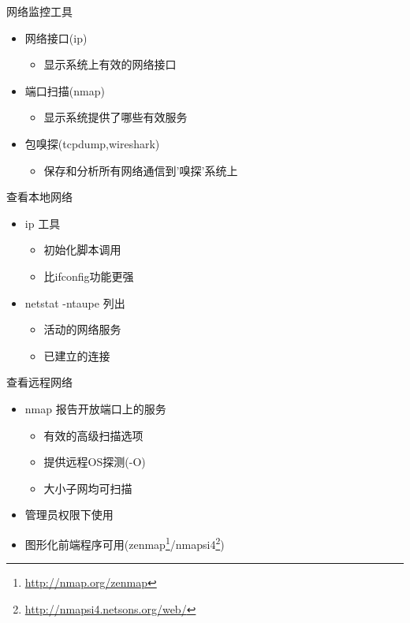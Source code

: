  \begin{frame}{网络监控工具}
\begin{itemize}
	\item 网络接口(ip)
	
	\begin{itemize}
		\item 显示系统上有效的网络接口
	\end{itemize}
	\item 端口扫描(nmap)
	
	\begin{itemize}
		\item 显示系统提供了哪些有效服务
	\end{itemize}
	\item 包嗅探(tcpdump,wireshark)
	
	\begin{itemize}
		\item 保存和分析所有网络通信到'嗅探'系统上
	\end{itemize}
\end{itemize}

\end{frame} 

\begin{frame}{查看本地网络}
\begin{itemize}
\item ip 工具

\begin{itemize}
\item 初始化脚本调用
\item 比ifconfig功能更强
\end{itemize}
\item netstat -ntaupe 列出

\begin{itemize}
\item 活动的网络服务
\item 已建立的连接
\end{itemize}
\end{itemize}

\end{frame} 

\begin{frame}{查看远程网络}
\begin{itemize}
\item nmap 报告开放端口上的服务

\begin{itemize}
\item 有效的高级扫描选项
\item 提供远程OS探测(-O)
\item 大小子网均可扫描
\end{itemize}
\item 管理员权限下使用
\item 图形化前端程序可用(zenmap\footnote{\href{http://nmap.org/zenmap/}{http://nmap.org/zenmap}}/nmapsi4\footnote{\href{http://nmapsi4.netsons.org/web/}{http://nmapsi4.netsons.org/web/}})
\end{itemize}

\end{frame} 


